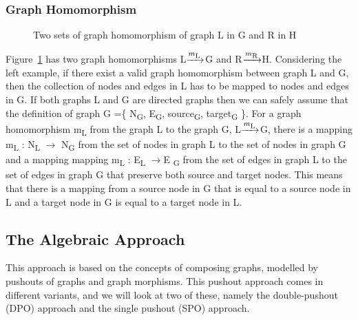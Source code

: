 \subsubsection*{Graph Homomorphism}

\begin{figure}[H]
	\centering
	\caption[Basic concepts of graph homomorphism]
	{Two sets of graph homomorphism of graph L in G and R in H}
	\label{fig:graphHomomorphism}
\end{figure}

Figure~\ref{fig:graphHomomorphism} has two graph homomorphisms
\mbox{L$\xrightarrow{m\textsubscript{L}}$G} and  
\mbox{R$\xrightarrow{m\textsubscript{R}}$H}. Considering the left example, if
there exist a valid graph homomorphism between graph L and G, then the
collection of nodes and edges in L has to be mapped to nodes and edges in G. If
both graphs L and G are directed graphs then we can safely assume that the
definition of graph G =\{ N\textsubscript{G}, E\textsubscript{G},
source\textsubscript{G}, target\textsubscript{G} \}. For a graph homomorphism
m\textsubscript{L} from the graph L to the graph G,
\mbox{L$\xrightarrow{m\textsubscript{L}}$G}, there is a mapping
m\textsubscript{L} : N\textsubscript{L} $\longrightarrow$ N\textsubscript{G}
from the set of nodes in graph L to the set of nodes in graph G and a mapping
mapping m\textsubscript{L} : E\textsubscript{L} $\longrightarrow$E
\textsubscript{G} from the set of edges in graph L to the set of edges in graph
G that preserve both source and target nodes. This means that there is a
mapping from a source node in G that is equal to a source node in L and a
target node in G is equal to a target node in L.

\subsection{The Algebraic Approach}
This approach is based on the concepts of composing graphs, modelled
by pushouts of graphs and graph morphisms. This pushout approach comes in
different variants, and we will look at two of these, namely the
double-pushout (DPO) approach and the single pushout (SPO)
approach\cite{Loewe1997,Ehrig1997}.

